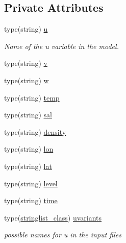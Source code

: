 \subsection*{Private Attributes}
\begin{DoxyCompactItemize}
\item 
type(string) \mbox{\hyperlink{structsimulationglobals__mod_1_1var__names__t_a05e03dc8cb0d9e041cd0989d4bb283f6}{u}}
\begin{DoxyCompactList}\small\item\em Name of the \textquotesingle{}u\textquotesingle{} variable in the model. \end{DoxyCompactList}\item 
type(string) \mbox{\hyperlink{structsimulationglobals__mod_1_1var__names__t_a037c76a1788e918a911686b1a357b63c}{v}}
\item 
type(string) \mbox{\hyperlink{structsimulationglobals__mod_1_1var__names__t_ae4070fb0bad811c92b85bb008b3a269d}{w}}
\item 
type(string) \mbox{\hyperlink{structsimulationglobals__mod_1_1var__names__t_a2b8a91d6d50fa1312daa7b33447a1f23}{temp}}
\item 
type(string) \mbox{\hyperlink{structsimulationglobals__mod_1_1var__names__t_aa74b646a2e2aecbd80fc9e14db09c1fc}{sal}}
\item 
type(string) \mbox{\hyperlink{structsimulationglobals__mod_1_1var__names__t_a8ece0e46cb7873a7b7f2a5ded27a93c8}{density}}
\item 
type(string) \mbox{\hyperlink{structsimulationglobals__mod_1_1var__names__t_ae81e1287e36878fcfed6360b14b05219}{lon}}
\item 
type(string) \mbox{\hyperlink{structsimulationglobals__mod_1_1var__names__t_aab90536922d15a1684cb7d0cfce99e95}{lat}}
\item 
type(string) \mbox{\hyperlink{structsimulationglobals__mod_1_1var__names__t_a1dc8ae36a22bfd43a9f1fd7e2d13548a}{level}}
\item 
type(string) \mbox{\hyperlink{structsimulationglobals__mod_1_1var__names__t_a3826ddc89095f68c7ff6ee007adaaa45}{time}}
\item 
type(\mbox{\hyperlink{structsimulationglobals__mod_1_1stringlist__class}{stringlist\+\_\+class}}) \mbox{\hyperlink{structsimulationglobals__mod_1_1var__names__t_a4a7350ba83ed451757bc06279a3ba337}{uvariants}}
\begin{DoxyCompactList}\small\item\em possible names for \textquotesingle{}u\textquotesingle{} in the input files \end{DoxyCompactList}\item 

\end{DoxyCompactItemize}
